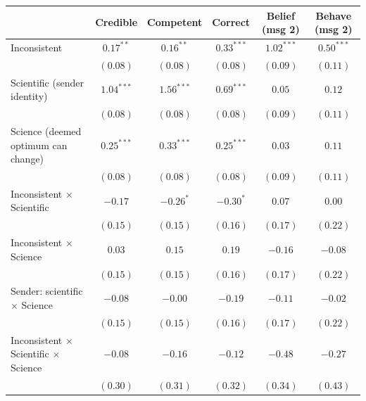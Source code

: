 
\begin{table}
\begin{center}
\begin{tabular}{l c c c c c}
\hline
 & Credible & Competent & Correct & Belief (msg 2) & Behave (msg 2) \\
\hline
Inconsistent                                      & $0.17^{**}$  & $0.16^{**}$  & $0.33^{***}$ & $1.02^{***}$ & $0.50^{***}$ \\
                                                  & $(0.08)$     & $(0.08)$     & $(0.08)$     & $(0.09)$     & $(0.11)$     \\
Scientific (sender identity)                      & $1.04^{***}$ & $1.56^{***}$ & $0.69^{***}$ & $0.05$       & $0.12$       \\
                                                  & $(0.08)$     & $(0.08)$     & $(0.08)$     & $(0.09)$     & $(0.11)$     \\
Science (deemed optimum can change)               & $0.25^{***}$ & $0.33^{***}$ & $0.25^{***}$ & $0.03$       & $0.11$       \\
                                                  & $(0.08)$     & $(0.08)$     & $(0.08)$     & $(0.09)$     & $(0.11)$     \\
Inconsistent $\times$ Scientific                  & $-0.17$      & $-0.26^{*}$  & $-0.30^{*}$  & $0.07$       & $0.00$       \\
                                                  & $(0.15)$     & $(0.15)$     & $(0.16)$     & $(0.17)$     & $(0.22)$     \\
Inconsistent $\times$ Science                     & $0.03$       & $0.15$       & $0.19$       & $-0.16$      & $-0.08$      \\
                                                  & $(0.15)$     & $(0.15)$     & $(0.16)$     & $(0.17)$     & $(0.22)$     \\
Sender: scientific $\times$ Science               & $-0.08$      & $-0.00$      & $-0.19$      & $-0.11$      & $-0.02$      \\
                                                  & $(0.15)$     & $(0.15)$     & $(0.16)$     & $(0.17)$     & $(0.22)$     \\
Inconsistent $\times$ Scientific $\times$ Science & $-0.08$      & $-0.16$      & $-0.12$      & $-0.48$      & $-0.27$      \\
                                                  & $(0.30)$     & $(0.31)$     & $(0.32)$     & $(0.34)$     & $(0.43)$     \\

\end{tabular}
\end{center}
\end{table}
